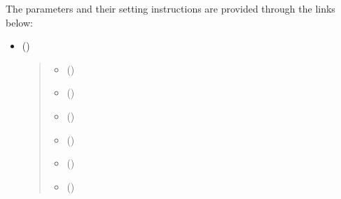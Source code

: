 \documentclass[letterpaper,10pt,english]{sphinxmanual}
\begin{document}
The parameters and their setting instructions are provided through the links below:
\begin{itemize}
\item {} 
{\hyperref[\detokenize{input_files/RunControl/Model_run_options:model-run-options}]{}} ()
\begin{quote}
\begin{itemize}\setlength{\itemsep}{0pt}\setlength{\parskip}{0pt}
\item {} 
{\hyperref[\detokenize{input_files/RunControl/Model_run_options:cmdoption-arg-cbluse}]{}} ()

\item {} 
{\hyperref[\detokenize{input_files/RunControl/Model_run_options:cmdoption-arg-snowuse}]{}} ()

\item {} 
{\hyperref[\detokenize{input_files/RunControl/Model_run_options:cmdoption-arg-solweiguse}]{}} ()

\item {} 
{\hyperref[\detokenize{input_files/RunControl/Model_run_options:cmdoption-arg-netradiationmethod}]{}} ()

\item {} 
{\hyperref[\detokenize{input_files/RunControl/Model_run_options:cmdoption-arg-anthropheatmethod}]{}} ()

\item {} 
{\hyperref[\detokenize{input_files/RunControl/Model_run_options:cmdoption-arg-anthropco2method}]{}} ()


\end{itemize}
\end{quote}
\end{itemize}
\end{document}
